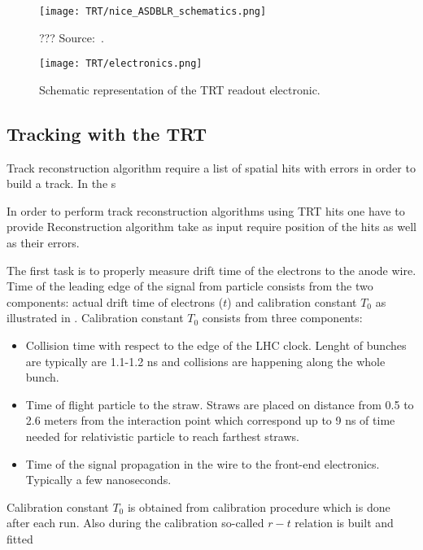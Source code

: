 \begin{figure}
\centering
\texttt{[image: TRT/nice\_ASDBLR\_schematics.png]}
\caption{ 
 ??? Source:~\cite{Aad:2008zzm}.
}
\label{fig:nice_asdblr_schematics}
\end{figure}


\begin{figure}
\centering
\texttt{[image: TRT/electronics.png]}
\caption{ 
 Schematic representation of the TRT readout electronic.
}
\label{fig:electronics}
\end{figure}



\subsection{Tracking with the TRT}

Track reconstruction algorithm require a list of spatial hits with errors in order to build a track.
In the s

In order to perform track reconstruction algorithms using TRT hits one have to provide 
Reconstruction algorithm take as input require position of the hits as well as their errors.

The first task is to properly measure drift time of the electrons to the anode wire. Time of the leading edge of the signal from particle
consists from the two components: actual drift time of electrons ($t$) and calibration constant $T_{0}$ as illustrated in .
Calibration constant $T_{0}$ consists from three components:
\begin{itemize}
 \item Collision time with respect to the edge of the LHC clock. Lenght of bunches are typically are 1.1-1.2 ns and collisions are happening along the whole bunch.
 \item Time of flight particle to the straw. Straws are placed on distance from 0.5 to 2.6 meters from the interaction point 
 which correspond up to 9 ns of time needed for relativistic particle to reach farthest straws.
 \item Time of the signal propagation in the wire to the front-end electronics. Typically a few nanoseconds.
\end{itemize}
Calibration constant $T_{0}$ is obtained from calibration procedure which is done after each run.
Also during the calibration so-called $r-t$ relation is built and fitted 

